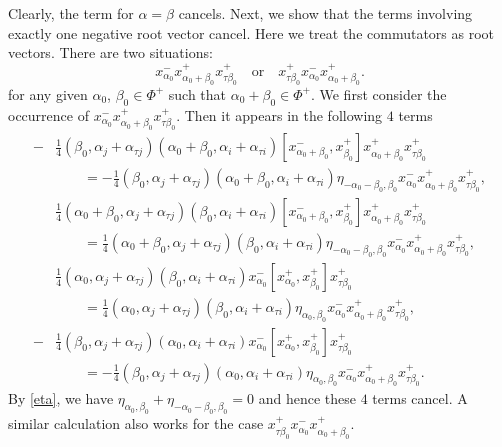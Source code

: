 \documentclass[11pt,reqno]{amsart}
\numberwithin{equation}{section}
\theoremstyle{definition}
\theoremstyle{remark}
\begin{document}
Clearly, the term for $\alpha = \beta$ cancels.
Next, we show that the terms involving exactly one negative root vector cancel. Here we treat the commutators as root vectors. There are two situations:
\[
x_{\alpha_0}^{-} x_{\alpha_0+\beta_0}^{+} x_{\tau\beta_0}^{+}
\quad \text{or} \quad
x_{\tau\beta_0}^{+} x_{\alpha_0}^{-} x_{\alpha_0+\beta_0}^{+}.
\]
for any given $\alpha_0$, $\beta_0 \in \Phi^+$ such that $\alpha_0+\beta_0\in\Phi^+$. We first consider the occurrence of $x_{\alpha_0}^{-} x_{\alpha_0+\beta_0}^{+} x_{\tau\beta_0}^{+}$. Then it appears in the following $4$ terms
\begin{align*}
-&\tfrac{1}{4}
(\beta_0,\alpha_j+\alpha_{\tau j})
(\alpha_0+\beta_0,\alpha_i+\alpha_{\tau i})
[x_{\alpha_0+\beta_0}^{-},x_{\beta_0}^{+}]
x_{\alpha_0+\beta_0}^{+}x_{\tau\beta_0}^{+}
\\
&\qquad = -\tfrac{1}{4}
(\beta_0,\alpha_j+\alpha_{\tau j})
(\alpha_0+\beta_0,\alpha_i+\alpha_{\tau i})
\eta_{-\alpha_0-\beta_0, \beta_0}x_{\alpha_0}^{-}
x_{\alpha_0+\beta_0}^{+}x_{\tau\beta_0}^{+},
\\
&\tfrac{1}{4}(\alpha_0+\beta_0,\alpha_j+\alpha_{\tau j})
(\beta_0,\alpha_i+\alpha_{\tau i})
[x_{\alpha_0+\beta_0}^{-},x_{\beta_0}^{+}]
x_{\alpha_0+\beta_0}^{+}x_{\tau\beta_0}^{+}
\\
&\qquad = \tfrac{1}{4}(\alpha_0+\beta_0,\alpha_j+\alpha_{\tau j})
(\beta_0,\alpha_i+\alpha_{\tau i})
\eta_{-\alpha_0-\beta_0, \beta_0}x_{\alpha_0}^{-}
x_{\alpha_0+\beta_0}^{+}x_{\tau\beta_0}^{+},
\\
&\tfrac{1}{4}(\alpha_0,\alpha_j+\alpha_{\tau j})
(\beta_0,\alpha_i+\alpha_{\tau i})
x_{\alpha_0}^{-}
[x_{\alpha_0}^{+},x_{\beta_0}^{+}]
x_{\tau\beta_0}^{+} 
\\ 
&\qquad = \tfrac{1}{4}(\alpha_0,\alpha_j+\alpha_{\tau j})
(\beta_0,\alpha_i+\alpha_{\tau i}) \eta_{\alpha_0, \beta_0}
x_{\alpha_0}^{-}
x_{\alpha_0+\beta_0}^+
x_{\tau\beta_0}^{+},
\\
-&\tfrac{1}{4}
(\beta_0,\alpha_j+\alpha_{\tau j})
(\alpha_0,\alpha_i+\alpha_{\tau i})
x_{\alpha_0}^{-}
[x_{\alpha_0}^{+},x_{\beta_0}^{+}]
x_{\tau\beta_0}^{+}
\\ 
&\qquad = -\tfrac{1}{4}
(\beta_0,\alpha_j+\alpha_{\tau j})
(\alpha_0,\alpha_i+\alpha_{\tau i})\eta_{\alpha_0, \beta_0}
x_{\alpha_0}^{-}
x_{\alpha_0+\beta_0}^+
x_{\tau\beta_0}^{+}.
\end{align*}
By \eqref{eta}, we have $\eta_{\alpha_0,\beta_0} + \eta_{-\alpha_0-\beta_0, \beta_0} = 0$ and hence these $4$ terms cancel. A similar calculation also works for the case $x_{\tau\beta_0}^{+} x_{\alpha_0}^{-} x_{\alpha_0+\beta_0}^{+}$.
\end{document}
